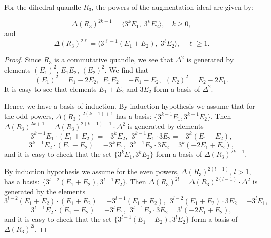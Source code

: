 \documentclass[10pt,a4paper]{amsart}
\begin{document}
\begin{pro}\label{pro4.8}
For the dihedral quandle $R_3$, the powers of the augmentation ideal are given by:%

\[
\Delta(R_3)^{2k+1}
= \langle 3^k E_1,\; 3^k E_2 \rangle,
\quad k \ge 0,
\]
and
\[
\Delta(R_3)^{2\ell}
= \langle 3^{\ell-1}(E_1+E_2),\; 3^\ell E_2 \rangle,
\quad \ell \ge 1.
\]
 



\end{pro}

\begin{proof}

Since $R_3$ is a commutative quandle, we see that $\Delta^2$ is generated by elements $(E_1)^2$, $E_1 E_2$, $(E_2)^2$. We find that
$$
(E_1)^2 = E_1 - 2 E_2,~~E_1 E_2 = - E_1 -  E_2,~~(E_2)^2 = E_2 - 2 E_1.
$$
It is easy to see that elements $E_1 + E_2$ and $3 E_2$ form a basis of $\Delta^2$.

Hence, we have a basis of induction.  By induction hypothesis we assume that for the odd powers,   $\Delta(R_3)^{2(k-1) + 1}$  has a basis: $\{ 3^{k-1} E_1, 3^{k-1} E_2 \}$. Then $\Delta(R_3)^{2k + 1} = \Delta(R_3)^{2(k-1) + 1} \cdot \Delta^2$ is generated by elements
$$
3^{k-1} E_1 \cdot (E_1 + E_2) = - 3^{k} E_2,~~3^{k-1} E_1 \cdot 3 E_2 = - 3^{k} (E_1 + E_2),
$$
$$
3^{k-1} E_2 \cdot (E_1 + E_2) =  - 3^k E_1,~~
3^{k-1} E_2 \cdot 3 E_2 =  3^k (-2 E_1 + E_2),
$$
and it is easy to check that the set  $\{ 3^{k} E_1, 3^{k} E_2 \}$ form a basis of  $\Delta(R_3)^{2k + 1}$.

 By  induction hypothesis we assume for the even powers,   $\Delta(R_3)^{2(l-1)}$, $l > 1$,  has a basis: $\{ 3^{l-2} (E_1 + E_2), 3^{l-1} E_2 \}$. Then $\Delta(R_3)^{2l} = \Delta(R_3)^{2(l-1)}\cdot \Delta^2$ is generated by the elements
$$
3^{l-2} (E_1 + E_2) \cdot (E_1 + E_2) = - 3^{l-1} (E_1 + E_2),~~3^{l-2} (E_1 + E_2) \cdot 3 E_2 = - 3^{l} E_1,
$$
$$
3^{l-1} E_2  \cdot (E_1 + E_2) =  - 3^l E_1,~~3^{l-1} E_2  \cdot 3 E_2 =  3^l (-2 E_1 + E_2),
$$
and it is easy to check that the set  $\{ 3^{l-1}(E_1 + E_2), 3^{l} E_2 \}$ form a basis of  $\Delta(R_3)^{2l}$.

\end{proof}
\end{document}
